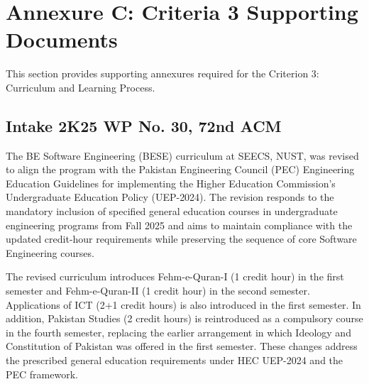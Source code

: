 \clearpage
\chapter*{Annexure C: Criteria 3 Supporting Documents}
{}
\label{app:crtieria-3}




This section provides supporting annexures required for the Criterion 3: Curriculum and Learning Process.


\setcounter{section}{0}
\renewcommand{\thesection}{C.\arabic{section}}
\renewcommand{\theHsection}{annexC.\arabic{section}}


\section{Intake 2K25 WP No. 30, 72nd ACM}
\label{app:criteria3-intake-2k25-wp30}
The BE Software Engineering (BESE) curriculum at SEECS, NUST, was revised to align the program with the Pakistan Engineering Council (PEC) Engineering Education Guidelines for implementing the Higher Education Commission’s Undergraduate Education Policy (UEP-2024). The revision responds to the mandatory inclusion of specified general education courses in undergraduate engineering programs from Fall 2025 and aims to maintain compliance with the updated credit-hour requirements while preserving the sequence of core Software Engineering courses.

The revised curriculum introduces Fehm-e-Quran-I (1 credit hour) in the first semester and Fehm-e-Quran-II (1 credit hour) in the second semester. Applications of ICT (2+1 credit hours) is also introduced in the first semester. In addition, Pakistan Studies (2 credit hours) is reintroduced as a compulsory course in the fourth semester, replacing the earlier arrangement in which Ideology and Constitution of Pakistan was offered in the first semester. These changes address the prescribed general education requirements under HEC UEP-2024 and the PEC framework.

